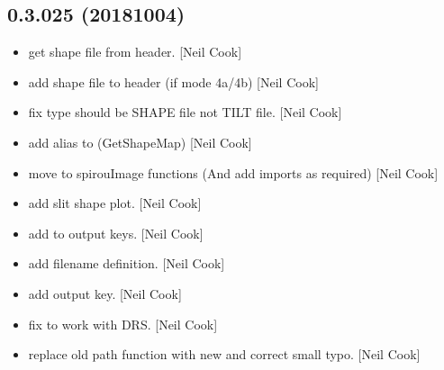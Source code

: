 \documentclass[a4paper,10pt,english]{report}
\begin{document}
\subsection{0.3.025 (2018\sphinxhyphen{}10\sphinxhyphen{}04)}
\label{\detokenize{misc/changelog:id326}}\begin{itemize}
\item {} 
 \sphinxhyphen{} get shape file from header. {[}Neil Cook{]}

\item {} 
 \sphinxhyphen{} add shape file to header (if mode 4a/4b)
{[}Neil Cook{]}

\item {} 
 \sphinxhyphen{} fix type \sphinxhyphen{} should be SHAPE file not TILT file.
{[}Neil Cook{]}

\item {} 
 \sphinxhyphen{} add alias to  (GetShapeMap)
{[}Neil Cook{]}

\item {} 
 \sphinxhyphen{} move  to spirouImage functions (And add
imports as required) {[}Neil Cook{]}

\item {} 
 \sphinxhyphen{} add slit shape plot. {[}Neil Cook{]}

\item {} 
 \sphinxhyphen{} add  to output keys. {[}Neil Cook{]}

\item {} 
 \sphinxhyphen{} add  filename definition. {[}Neil Cook{]}

\item {} 
 \sphinxhyphen{} add  output key. {[}Neil Cook{]}

\item {} 
 \sphinxhyphen{} fix to work with DRS. {[}Neil Cook{]}

\item {} 
 \sphinxhyphen{} replace old path function with new and correct
small typo. {[}Neil Cook{]}


\end{itemize}
\end{document}
